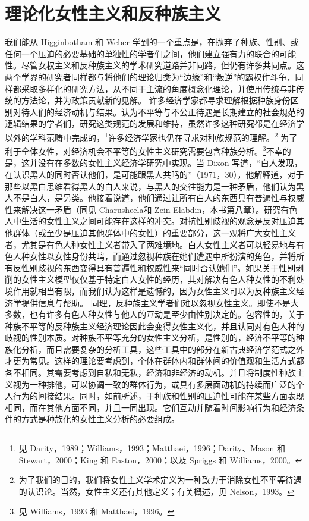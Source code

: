 \documentclass[UTF8]{ctexart}
\begin{document}
\section{理论化女性主义和反种族主义}我们能从 Higginbotham 和 Weber 学到的一个重点是，在抛弃了种族、性别、或任何一个压迫的必要基础的单独性的学者们之间，他们建立强有力的联合的可能性。尽管女权主义和反种族主义的学术研究道路并非同路，但仍有许多共同点。这两个学界的研究者同样都与将他们的理论归类为“边缘”和“叛逆”的霸权作斗争，同样都采取多样化的研究方法，从不同于主流的角度概念化理论，并使用传统与非传统的方法论，并为政策贡献新的见解。
许多经济学家都寻求理解根据种族身份区别对待人们的经济动机与结果。认为不平等与不公正待遇是长期建立的社会规范的逻辑结果的学者们，研究这类规范的发展和维持，虽然许多这种研究都是在经济学以外的学科范畴中完成的，\footnote[14]{见 Darity，1989；Williams，1993；Matthaei，1996；Darity、Mason 和 Stewart，2000；King 和 Easton，2000；以及 Spriggs 和 Williams，2000。}许多经济学家也仍在寻求对种族规范的理解。\footnote[15]{为了我们的目的，我们将女性主义学术定义为一种致力于消除女性不平等待遇的认识论。当然，女性主义还有其他定义；有关概述，见 Nelson，1993。}
为了利于全体女性，对经济机会不平等的女性主义研究需要包含种族分析。\footnote[16]{见 Williams，1993 和 Matthaei，1996。}不幸的是，这并没有在多数的女性主义经济学研究中实现。当 Dixon 写道，“白人发现，在认识黑人的同时否认他们，是可能跟黑人共鸣的”（1971，30），他解释道，对于那些以黑白思维看得黑人的白人来说，与黑人的交往能力是一种矛盾，他们认为黑人不是白人，是另类。他接着说道，他们通过让所有白人的东西具有普遍性与权威性来解决这一矛盾（同见 Charusheela和 Zein-Elabdin，本书第八章）。研究有色人中生活的女性主义之间可能存在这样的冲突。对抗性别歧视的观念是反对压迫其他群体（或至少是压迫其他群体中的女性）的重要部分，这一观将广大女性主义者，尤其是有色人种女性主义者带入了两难境地。白人女性主义者可以轻易地与有色人种女性以女性身份共鸣，而通过忽视种族在她们遭遇中所扮演的角色，并将所有反性别歧视的东西变得具有普遍性和权威性来“同时否认她们”。如果关于性别剥削的女性主义模型仅仅基于特定白人女性的经历，其对解决有色人种女性的不利处境作用就相当有限，而我们认为这样是遗憾的，因为女性主义可以为反种族主义经济学提供信息与帮助。
同理，反种族主义学者们难以忽视女性主义。即使不是大多数，也有许多有色人种女性与他人的互动是至少由性别决定的。包容性的，关于种族不平等的反种族主义经济理论因此会变得女性主义化，并且认同对有色人种的歧视的性别本质。对种族不平等充分的女性主义分析，是性别的，经济不平等的种族化分析，而且需要复杂的分析工具，这些工具中的部分在新古典经济学范式之外才更为常见。这样的理论要考虑到，个体在群体内和群体间的价值观和生活方式都各不相同。其需要考虑到自私和无私，经济和非经济的动机。并且将制度性种族主义视为一种排他，可以协调一致的群体行为，或具有多层面动机的持续而广泛的个人行为的间接结果。同时，如前所述，于种族和性别的压迫性可能在某些方面表现相同，而在其他方面不同，并且一同出现。它们互动并随着时间影响行为和经济条件的方式是种族化的女性主义分析的必要组成。
\end{document}
